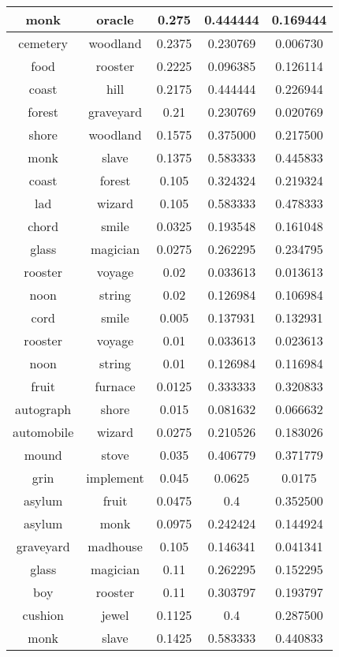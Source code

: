 \begin{center}
{\begin{longtable}{|c|c|c|c|c|}
\hline
monk & oracle & 0.275 & 0.444444 & 0.169444 \\
\hline
cemetery & woodland & 0.2375 & 0.230769 & 0.006730 \\
\hline
food & rooster & 0.2225 & 0.096385 & 0.126114 \\
\hline
coast & hill & 0.2175 & 0.444444 & 0.226944 \\
\hline
forest & graveyard & 0.21 & 0.230769 & 0.020769 \\
\hline
shore & woodland & 0.1575 & 0.375000 & 0.217500 \\
\hline
monk & slave & 0.1375 & 0.583333 & 0.445833 \\
\hline
coast & forest & 0.105 & 0.324324 & 0.219324 \\
\hline
lad & wizard & 0.105 & 0.583333 & 0.478333 \\
\hline
chord & smile & 0.0325 & 0.193548 & 0.161048 \\
\hline
glass & magician & 0.0275 & 0.262295 & 0.234795 \\
\hline
rooster & voyage & 0.02 & 0.033613 & 0.013613 \\
\hline
noon & string & 0.02 & 0.126984 & 0.106984 \\
\hline
cord & smile & 0.005 & 0.137931 & 0.132931 \\
\hline
rooster & voyage & 0.01 & 0.033613 & 0.023613 \\
\hline
noon & string & 0.01 & 0.126984 & 0.116984 \\
\hline
fruit & furnace & 0.0125 & 0.333333 & 0.320833 \\
\hline
autograph & shore & 0.015 & 0.081632 & 0.066632 \\
\hline
automobile & wizard & 0.0275 & 0.210526 & 0.183026 \\
\hline
mound & stove & 0.035 & 0.406779 & 0.371779 \\
\hline
grin & implement & 0.045 & 0.0625 & 0.0175 \\
\hline
asylum & fruit & 0.0475 & 0.4 & 0.352500 \\
\hline
asylum & monk & 0.0975 & 0.242424 & 0.144924 \\
\hline
graveyard & madhouse & 0.105 & 0.146341 & 0.041341 \\
\hline
glass & magician & 0.11 & 0.262295 & 0.152295 \\
\hline
boy & rooster & 0.11 & 0.303797 & 0.193797 \\
\hline
cushion & jewel & 0.1125 & 0.4 & 0.287500 \\
\hline
monk & slave & 0.1425 & 0.583333 & 0.440833 \\

\end{longtable}}
\end{center}

